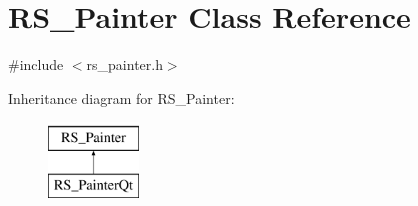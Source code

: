 \hypertarget{classRS__Painter}{\section{R\-S\-\_\-\-Painter Class Reference}
\label{classRS__Painter}
}


{\ttfamily \#include $<$rs\-\_\-painter.\-h$>$}

Inheritance diagram for R\-S\-\_\-\-Painter\-:\begin{figure}[H]
\begin{center}
\leavevmode
\includegraphics[height=2.000000cm]{classRS__Painter}
\end{center}
\end{figure}

